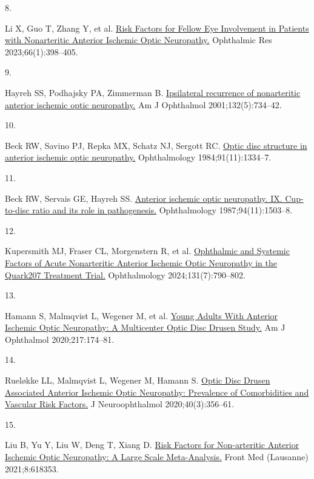 \documentclass[
  11pt,
]{article}
\newlength{\cslhangindent}
\newlength{\csllabelwidth}
\newenvironment{CSLReferences}[2] %
 {\begin{list}{}{%
  \setlength{\itemindent}{0pt}
  \setlength{\leftmargin}{0pt}
  \setlength{\parsep}{0pt}
  \ifodd #1
   \setlength{\leftmargin}{\cslhangindent}
   \setlength{\itemindent}{-1\cslhangindent}
  \fi
  \setlength{\itemsep}{#2\baselineskip}}}
 {\end{list}}
\newcommand{\CSLLeftMargin}[1]{\parbox[t]{\csllabelwidth}{\strut#1\strut}}
\newcommand{\CSLRightInline}[1]{\parbox[t]{\linewidth - \csllabelwidth}{\strut#1\strut}}
\begin{document}
\begin{CSLReferences}{0}{1}
\CSLLeftMargin{8. }%
\CSLRightInline{Li X, Guo T, Zhang Y, et al.
\href{https://doi.org/10.1159/000528627}{{Risk Factors for Fellow Eye
Involvement in Patients with Nonarteritic Anterior Ischemic Optic
Neuropathy.}} Ophthalmic Res 2023;66(1):398--405. }

\CSLLeftMargin{9. }%
\CSLRightInline{Hayreh SS, Podhajsky PA, Zimmerman B.
\href{https://doi.org/10.1016/s0002-9394(01)01192-8}{{Ipsilateral
recurrence of nonarteritic anterior ischemic optic neuropathy.}} Am J
Ophthalmol 2001;132(5):734--42. }

\CSLLeftMargin{10. }%
\CSLRightInline{Beck RW, Savino PJ, Repka MX, Schatz NJ, Sergott RC.
\href{https://doi.org/10.1016/s0161-6420(84)34146-x}{{Optic disc
structure in anterior ischemic optic neuropathy.}} Ophthalmology
1984;91(11):1334--7. }

\CSLLeftMargin{11. }%
\CSLRightInline{Beck RW, Servais GE, Hayreh SS. \href{}{{Anterior
ischemic optic neuropathy. IX. Cup-to-disc ratio and its role in
pathogenesis.}} Ophthalmology 1987;94(11):1503--8. }

\CSLLeftMargin{12. }%
\CSLRightInline{Kupersmith MJ, Fraser CL, Morgenstern R, et al.
\href{https://doi.org/10.1016/j.ophtha.2024.01.011}{{Ophthalmic and
Systemic Factors of Acute Nonarteritic Anterior Ischemic Optic
Neuropathy in the Quark207 Treatment Trial.}} Ophthalmology
2024;131(7):790--802. }

\CSLLeftMargin{13. }%
\CSLRightInline{Hamann S, Malmqvist L, Wegener M, et al.
\href{https://doi.org/10.1016/j.ajo.2020.03.052}{{Young Adults With
Anterior Ischemic Optic Neuropathy: A Multicenter Optic Disc Drusen
Study.}} Am J Ophthalmol 2020;217:174--81. }

\CSLLeftMargin{14. }%
\CSLRightInline{Rueløkke LL, Malmqvist L, Wegener M, Hamann S.
\href{https://doi.org/10.1097/WNO.0000000000000885}{{Optic Disc Drusen
Associated Anterior Ischemic Optic Neuropathy: Prevalence of
Comorbidities and Vascular Risk Factors.}} J Neuroophthalmol
2020;40(3):356--61. }

\CSLLeftMargin{15. }%
\CSLRightInline{Liu B, Yu Y, Liu W, Deng T, Xiang D.
\href{https://doi.org/10.3389/fmed.2021.618353}{{Risk Factors for
Non-arteritic Anterior Ischemic Optic Neuropathy: A Large Scale
Meta-Analysis.}} Front Med (Lausanne) 2021;8:618353. }


\end{CSLReferences}
\end{document}
